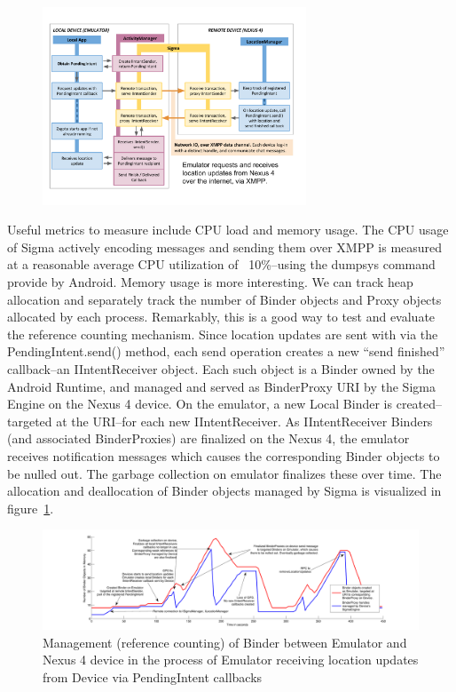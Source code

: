 \documentclass[prodmode]{acmlarge}
\begin{document}
\begin{figure}[h]
\centering
\includegraphics[width=0.7\textwidth]{drawings/LocationPendingIntentExample.pdf}
\end{figure}

Useful metrics to measure include CPU load and memory usage. The CPU usage of Sigma actively encoding messages and sending them over XMPP is measured at a reasonable average CPU utilization of ~10\%--using the dumpsys command provide by Android. Memory usage is more interesting. We can track heap allocation and separately track the number of Binder objects and Proxy objects allocated by each process. Remarkably, this is a good way to test and evaluate the reference counting mechanism. Since location updates are sent with via the PendingIntent.send() method, each send operation creates a new ``send finished'' callback--an IIntentReceiver object. Each such object is a Binder owned by the Android Runtime, and managed and served as BinderProxy URI by the Sigma Engine on the Nexus 4 device. On the emulator, a new Local Binder is created--targeted at the URI--for each new IIntentReceiver. As IIntentReceiver Binders (and associated BinderProxies) are finalized on the Nexus 4, the emulator receives notification messages which causes the corresponding Binder objects to be nulled out. The garbage collection on emulator finalizes these over time. The allocation and deallocation of Binder objects managed by Sigma is visualized in figure~\ref{fig:reference_counting}.

\begin{figure}[h]
\centering
\includegraphics[width=\textwidth]{plots/location_sharing_reference_counting.pdf}
\caption{Management (reference counting) of Binder between Emulator and Nexus 4 device in the process of Emulator receiving location updates from Device via PendingIntent callbacks}
\label{fig:reference_counting}
\end{figure}
\end{document}
